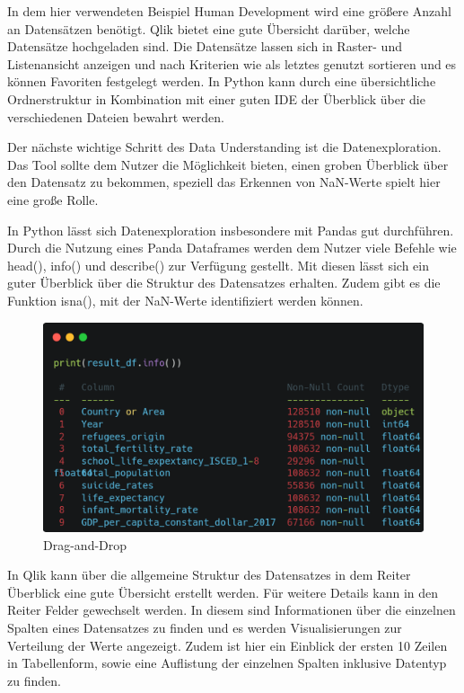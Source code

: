 \documentclass[12pt]{article}
\begin{document}
	In dem hier verwendeten Beispiel Human Development wird eine größere Anzahl an Datensätzen benötigt. Qlik bietet eine gute Übersicht darüber, welche Datensätze hochgeladen sind. Die Datensätze lassen sich in Raster- und Listenansicht anzeigen und nach Kriterien wie als letztes genutzt sortieren und es können Favoriten festgelegt werden. In Python kann durch eine übersichtliche Ordnerstruktur in Kombination mit einer guten IDE der Überblick über die verschiedenen Dateien bewahrt werden.
	
	Der nächste wichtige Schritt des Data Understanding ist die Datenexploration. Das Tool sollte dem Nutzer die Möglichkeit bieten, einen groben Überblick über den Datensatz zu bekommen, speziell das Erkennen von NaN-Werte spielt hier eine große Rolle.
	
	In Python lässt sich Datenexploration insbesondere mit Pandas gut durchführen. Durch die Nutzung eines Panda Dataframes werden dem Nutzer viele Befehle wie head(), info() und describe() zur Verfügung gestellt. Mit diesen lässt sich ein guter Überblick über die Struktur des Datensatzes erhalten. Zudem gibt es die Funktion isna(), mit der NaN-Werte identifiziert werden können.	
	\begin{figure}[h]
		\centering
		\includegraphics[width=1.0\textwidth]{info()2}
		\caption{Drag-and-Drop}
	\end{figure}
	In Qlik kann über die allgemeine Struktur des Datensatzes in dem Reiter Überblick eine gute Übersicht erstellt werden. Für weitere Details kann in den Reiter Felder gewechselt werden. In diesem sind Informationen über die einzelnen Spalten eines Datensatzes zu finden und es werden Visualisierungen zur Verteilung der Werte angezeigt. Zudem ist hier ein Einblick der ersten 10 Zeilen in Tabellenform, sowie eine Auflistung der einzelnen Spalten inklusive Datentyp zu finden.
	
\end{document}

